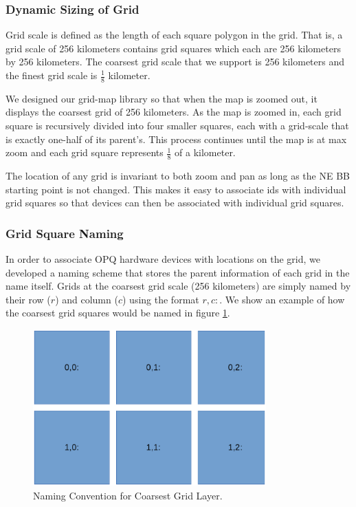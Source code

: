 \documentclass[11pt]{article}
\begin{document}
\subsubsection{Dynamic Sizing of Grid}
Grid scale is defined as the length of each square polygon in the grid. That is, a grid scale of 256 kilometers contains grid squares which each are 256 kilometers by 256 kilometers. The coarsest grid scale that we support is 256 kilometers and the finest grid scale is $\frac{1}{8}$ kilometer.

We designed our grid-map library so that when the map is zoomed out, it displays the coarsest grid of 256 kilometers. As the map is zoomed in, each grid square is recursively divided into four smaller squares, each with a grid-scale that is exactly one-half of its parent's. This process continues until the map is at max zoom and each grid square represents $\frac{1}{8}$ of a kilometer.

The location of any grid is invariant to both zoom and pan as long as the NE BB starting point is not changed. This makes it easy to associate ids with individual grid squares so that devices can then be associated with individual grid squares.

\subsubsection{Grid Square Naming}
In order to associate OPQ hardware devices with locations on the grid, we developed a naming scheme that stores the parent information of each grid in the name itself. Grids at the coarsest grid scale (256 kilometers) are simply named by their row ($r$) and column ($c$) using the format $r,c:$. We show  an example of how the coarsest grid squares would be named in figure \ref{fig:coarsest_grid_ids}.

\begin{figure}[htbp]
	\centering
	\includegraphics[width=0.8\textwidth]{figures/grid-sq.eps}
	\caption{Naming Convention for Coarsest Grid Layer.}
	\label{fig:coarsest_grid_ids}
\end{figure}
\end{document}

